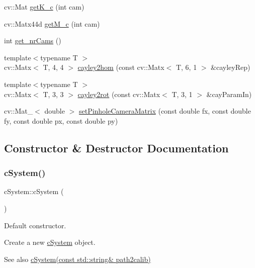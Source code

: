 \begin{DoxyCompactItemize}
cv\+::\+Mat \hyperlink{classcSystem_a2c5e497f4a8fd27d9a4a67f8de329b02}{get\+K\+\_\+c} (int cam)
\item 
cv\+::\+Matx44d \hyperlink{classcSystem_ad98d9a5cca9c20536605a7e7800db04f}{get\+M\+\_\+c} (int cam)
\item 
int \hyperlink{classcSystem_ae1fa352a5d3ac3a9ce3d4dc1d0d3ee08}{get\+\_\+nr\+Cams} ()
\item 
{\footnotesize template$<$typename T $>$ }\\cv\+::\+Matx$<$ T, 4, 4 $>$ \hyperlink{classcSystem_ad08b05bd8f360a671094b7ab6a1b08db}{cayley2hom} (const cv\+::\+Matx$<$ T, 6, 1 $>$ \&cayley\+Rep)
\item 
{\footnotesize template$<$typename T $>$ }\\cv\+::\+Matx$<$ T, 3, 3 $>$ \hyperlink{classcSystem_aaa6ff4626fafe84a7c0e3d9d892500cf}{cayley2rot} (const cv\+::\+Matx$<$ T, 3, 1 $>$ \&cay\+Param\+In)
\item 
cv\+::\+Mat\+\_\+$<$ double $>$ \hyperlink{classcSystem_a2cc39fd195d94873333c459da47d8244}{set\+Pinhole\+Camera\+Matrix} (const double fx, const double fy, const double px, const double py)
\end{DoxyCompactItemize}


\subsection{Constructor \& Destructor Documentation}
\mbox{\label{classcSystem_a6d79f7297df51a1c01eda770ee35f787}} 
\subsubsection{\texorpdfstring{c\+System()}{cSystem()}\hspace{0.1cm}{\footnotesize\ttfamily [1/2]}}
{\footnotesize\ttfamily c\+System\+::c\+System (\begin{DoxyParamCaption}{ }\end{DoxyParamCaption})\hspace{0.3cm}{\ttfamily [inline]}}



Default constructor. 

Create a new \hyperlink{classcSystem}{c\+System} object. \begin{DoxySeeAlso}{See also}
\hyperlink{classcSystem_a05f411bbf675671c4285dfd855eb9e84}{c\+System(const std\+::string\& path2calib)} 


\end{DoxySeeAlso}
\mbox{\label{classcSystem_a05f411bbf675671c4285dfd855eb9e84}} 
